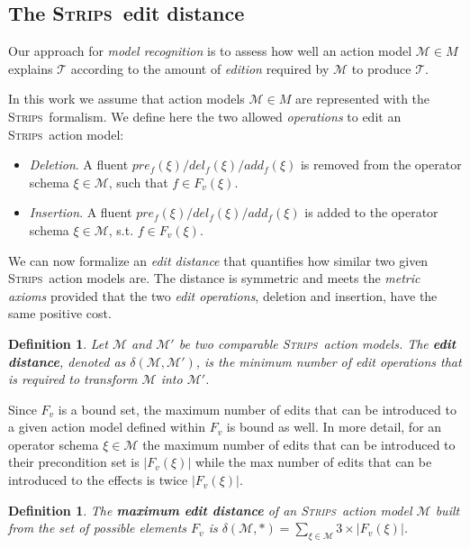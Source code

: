 \documentclass[letterpaper]{article} %
\newcommand{\strips}{\textsc{Strips}}     %
\newtheorem{definition}[theorem]{Definition}
\begin{document}
\subsection{The \strips\ edit distance}
Our approach for {\em model recognition} is to assess how well an action model $\mathcal{M}\in M$ explains $\mathcal{T}$ according to the amount of {\em edition} required by $\mathcal{M}$ to produce $\mathcal{T}$.

In this work we assume that action models $\mathcal{M}\in M$ are represented with the \strips\ formalism. We define here the two allowed \emph{operations} to edit an \strips\ action model:
\begin{itemize}
\item {\em Deletion}. A fluent $pre_f(\xi)/del_f(\xi)/add_f(\xi)$ is removed from the operator schema $\xi\in\mathcal{M}$, such that $f\in F_v(\xi)$.
\item {\em Insertion}. A fluent $pre_f(\xi)/del_f(\xi)/add_f(\xi)$ is added to the operator schema $\xi\in\mathcal{M}$, s.t. $f\in F_v(\xi)$.
\end{itemize}

We can now formalize an {\em edit distance} that quantifies how similar two given \strips\ action models are. The distance is symmetric and meets the {\em metric axioms} provided that the two {\em edit operations}, deletion and insertion, have the same positive cost.

\begin{definition}
  Let $\mathcal{M}$ and $\mathcal{M}'$ be two {\em comparable} \strips\ action models. The {\bf edit distance}, denoted as $\delta(\mathcal{M},\mathcal{M}')$, is the minimum number of {\em edit operations} that is required to transform $\mathcal{M}$ into $\mathcal{M}'$.
\end{definition}

Since $F_v$ is a bound set, the maximum number of edits that can be introduced to a given action model defined within $F_v$ is bound as well. In more detail, for an operator schema $\xi\in\mathcal{M}$ the maximum number of edits that can be introduced to their precondition set is $|F_v(\xi)|$ while the max number of edits that can be introduced to the effects is twice $|F_v(\xi)|$.
\begin{definition}
The \textbf{maximum edit distance} of an \strips\ action model $\mathcal{M}$ built from the set of possible elements $F_v$ is $\delta(\mathcal{M},*)=\sum_{\xi\in\mathcal{M}} 3\times|F_v(\xi)|$.
\end{definition}
\end{document}
